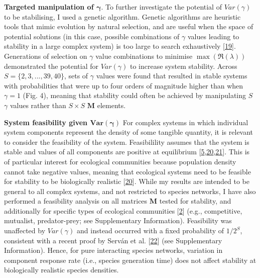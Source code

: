 \documentclass[]{article}
\begin{document}
\textbf{Targeted manipulation of \(\mathbf{\gamma}\)}. To further
investigate the potential of \(Var(\gamma)\) to be stabilising, I used a
genetic algorithm. Genetic algorithms are heuristic tools that mimic
evolution by natural selection, and are useful when the space of
potential solutions (in this case, possible combinations of \(\gamma\)
values leading to stability in a large complex system) is too large to
search exhaustively {[}\protect\hyperlink{ref-Hamblin2013}{19}{]}.
Generations of selection on \(\gamma\) value combinations to minimise
\(\max\left(\Re(\lambda)\right)\) demonstrated the potential for
\(Var(\gamma)\) to increase system stability. Across
\(S = \{2, 3, ..., 39, 40\}\), sets of \(\gamma\) values were found that
resulted in stable systems with probabilities that were up to four
orders of magnitude higher than when \(\gamma = 1\) (Fig. 4), meaning
that stability could often be achieved by manipulating \(S\) \(\gamma\)
values rather than \(S \times S\) \(\mathbf{M}\) elements.

\textbf{System feasibility given \(\mathbf{Var(\gamma)}\)} For complex
systems in which individual system components represent the density of
some tangible quantity, it is relevant to consider the feasibility of
the system. Feasibilility assumes that the system is stable and values
of all components are positive at equilibrium
{[}\protect\hyperlink{ref-Grilli2017}{5},\protect\hyperlink{ref-Dougoud2018}{20},\protect\hyperlink{ref-Song2018}{21}{]}.
This is of particular interest for ecological communities because
population density cannot take negative values, meaning that ecological
systems need to be feasible for stability to be biologically realistic
{[}\protect\hyperlink{ref-Dougoud2018}{20}{]}. While my results are
intended to be general to all complex systems, and not restricted to
species networks, I have also performed a feasibility analysis on all
matrices \(\mathbf{M}\) tested for stability, and additionally for
specific types of ecological communities
{[}\protect\hyperlink{ref-Allesina2012}{2}{]} (e.g., competitive,
mutualist, predator-prey; see Supplementary Information). Feasibility
was unaffected by \(Var(\gamma)\) and instead occurred with a fixed
probability of \(1/2^{S}\), consistent with a recent proof by Serván et
al. {[}\protect\hyperlink{ref-Servan2018}{22}{]} (see Supplementary
Information). Hence, for pure interacting species networks, variation in
component response rate (i.e., species generation time) does not affect
stability at biologically realistic species densities.
\end{document}
